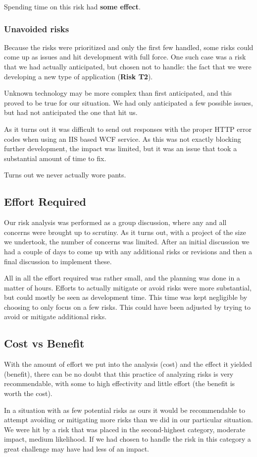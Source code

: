 Spending time on this risk had \textbf{some effect}.

\subsubsection{Unavoided risks}

Because the risks were prioritized and only the first few handled, some risks
could come up as issues and hit development with full force. One such case was a
risk that we had actually anticipated, but chosen not to handle: the fact that
we were developing a new type of application (\textbf{Risk T2}).

Unknown technology may be more complex than first anticipated, and this proved
to be true for our situation. We had only anticipated a few possible issues,
but had not anticipated the one that hit us.

As it turns out it was difficult to send out responses with the proper HTTP
error codes when using an IIS based WCF service. As this was not exactly
blocking further development, the impact was limited, but it was an issue that
took a substantial amount of time to fix.

Turns out we never actually wore pants.

\subsection{Effort Required}

Our risk analysis was performed as a group discussion, where any and all concerns were brought up to scrutiny.
As it turns out, with a project of the size we undertook, the number of concerns was limited. After an initial
discussion we had a couple of days to come up with any additional risks or revisions and then a final discussion
to implement these.

All in all the effort required was rather small, and the planning was done in a matter of hours. Efforts to actually
mitigate or avoid risks were more substantial, but could mostly be seen as development time. This time was kept
negligible by choosing to only focus on a few risks. This could have been adjusted by trying to avoid or mitigate
additional risks.

\subsection{Cost vs Benefit}

With the amount of effort we put into the analysis (cost) and the effect it yielded (benefit), there can be no doubt
that this practice of analyzing risks is very recommendable, with some to high effectivity and little effort (the
benefit is worth the cost).

In a situation with as few potential risks as ours it would be recommendable to attempt avoiding or mitigating more
risks than we did in our particular situation. We were hit by a risk that was placed in the second-highest category,
moderate impact, medium likelihood. If we had chosen to handle the risk in this category a great challenge may have
had less of an impact.
